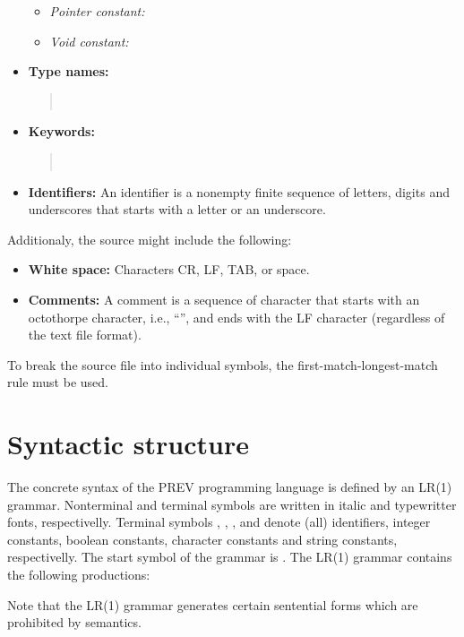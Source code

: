 \documentclass[10pt]{article}
\begin{document}
\begin{itemize}
\begin{itemize}
\item \textit{Pointer constant:} 
\item \textit{Void constant:} 
\end{itemize}
\item \textbf{Type names:}
\begin{quote}
\ \ \ \ \ \ \ \ 
\end{quote}
\item \textbf{Keywords:}
\begin{quote}
\ \ \ \ \ \ \ \ \ \ \ \ \ \ \ \ \ \ \ \ \ \ \ \ 
\end{quote}
\item \textbf{Identifiers:} An identifier is a nonempty finite sequence of letters, digits and underscores that starts with a letter or an underscore.
\end{itemize}
Additionaly, the source might include the following:
\begin{itemize}
\item \textbf{White space:} Characters CR, LF, TAB, or space.
\item \textbf{Comments:} A comment is a sequence of character that starts with an octothorpe character, i.e., ``\texttt{}'', and ends with the LF character (regardless of the text file format).
\end{itemize}

To break the source file into individual symbols, the first-match-longest-match rule must be used.

\section{Syntactic structure}

The concrete syntax of the PREV programming language is defined by an LR(1) grammar.  Nonterminal and terminal symbols are written in italic and typewritter fonts, respectivelly.  Terminal symbols , , ,  and  denote (all) identifiers, integer constants, bool\-ean constants, character constants and string constants, respectivelly.  The start symbol of the grammar is .  The LR(1) grammar contains the following productions:
\medskip\par

\begingroup
\parskip=0pt

\medskip\par
\endgroup

Note that the LR(1) grammar generates certain sentential forms which are prohibited by semantics.
\end{document}
